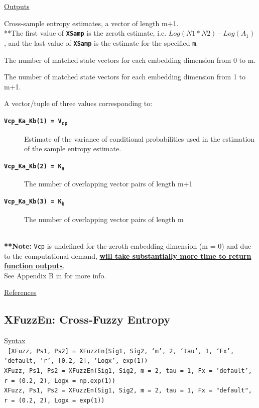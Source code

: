 \documentclass[12pt, a4paper, titlepage, openany]{book}
\begin{document}
\noindent \ul{Outputs}
\begin{description}[labelsep=1cm, labelwidth=2cm, nosep, style=multiline,leftmargin=3cm]\footnotesize
\item[\texttt{XSamp}]		Cross-sample entropy estimates, a vector of length m+1.\\
			**The first value of \texttt{\textbf{XSamp}} is the zeroth estimate, i.e.  $Log(N1*N2) \ – \ Log(A_1)$,
			and the last value of \texttt{\textbf{XSamp}} is the estimate for the specified \texttt{\textbf{m}}.
\item[\texttt{A}]		The number of matched state vectors for each embedding dimension from 0 to m.
\item[\texttt{B}]		The number of matched state vectors for each embedding dimension from 1 to m+1.
\item[\texttt{Vcp\_Ka\_Kb}]		A vector/tuple of three values corresponding to:
\begin{description}
\item[\texttt{\textbf{Vcp\_Ka\_Kb(1) = V\textsubscript{cp}}}]  Estimate of the variance of conditional probabilities used in the estimation of the sample entropy estimate.
\item[\texttt{\textbf{Vcp\_Ka\_Kb(2) = \textbf{K\textsubscript{a}}}}]  The number of overlapping vector pairs of length m+1
\item[\texttt{\textbf{\textbf{Vcp\_Ka\_Kb(3) = K\textsubscript{b}}}}]  The number of overlapping vector pairs of length m
\end{description}
\ \\ \textbf{**Note:} \texttt{Vcp} is undefined for the zeroth embedding dimension (m = 0) 
 and due to the computational demand, \textbf{\underline{will take substantially more time to return function outputs}}.\\
 See Appendix B in \cite{Samp2} for more info.
\end{description}

\noindent \ul{References}\hspace{1cm}
\cite{Samp1} \cite{Samp2}



\newpage
\subsection{\normalsize XFuzzEn: \hspace{15mm} Cross-Fuzzy Entropy} \label{XFuzzEn}
\noindent\ul{Syntax} \vspace{6mm} \\ \noindent \texttt{\footnotesize
[XFuzz, Ps1, Ps2] = XFuzzEn(Sig1, Sig2, ‘m’, 2, ‘tau’, 1, ‘Fx’, ‘default, ‘r’, [0.2, 2], ‘Logx’, exp(1))\\
XFuzz, Ps1, Ps2   = XFuzzEn(Sig1, Sig2, m = 2, tau = 1, Fx = 'default', r = (0.2, 2), Logx = np.exp(1))\\
XFuzz, Ps1, Ps2   = XFuzzEn(Sig1, Sig2, m = 2, tau = 1, Fx = "default", r = (0.2, 2), Logx = exp(1))}
\end{document}
